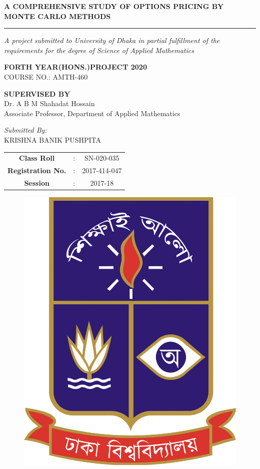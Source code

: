 
\thispagestyle{empty}
\begin{center}
	\textcolor{blue!60!black!80}{\Large\bf A COMPREHENSIVE STUDY OF OPTIONS PRICING BY}
	\textcolor{blue!60!black!80}{{\Large\bf MONTE CARLO METHODS\\}}
	\rule{\textwidth}{0.4pt}
	\textcolor{blue!60!black!100}{\it A project submitted to University of Dhaka in partial fulfillment of the requirements for the degree of Science of Applied Mathematics}
	\vspace{.4in}
\end{center}
\begin{center}
	\textcolor{blue!60!black!80}{\bf FORTH YEAR(HONS.)PROJECT 2020}\\
	\vspace{3pt}
	{COURSE NO.: AMTH-460}
\end{center}
\begin{center}
	\textcolor{blue!60!black!80}{\bf SUPERVISED BY}\\
	\vspace{3pt}
	{Dr. A B M Shahadat Hossain}\\
		{Associate Professor,
			Department of Applied Mathematics}
\end{center}
\vspace{.3in}
\begin{center}
	\textcolor{blue!60!black!80}{\it Submitted By:}\\[2mm]
	KRISHNA BANIK PUSHPITA\\[2mm]
	\begin{tabular}{ c c c}
		{\bf Class Roll} & :& \hspace{0.3in}SN-020-035  \\ 
		{\bf Registration No.} &: & \hspace{0.4in}2017-414-047  \\  
		{\bf Session} & :&2017-18     
	\end{tabular}
	
	\vspace{.6in}
\end{center}

\begin{figure}[H]
	\centering
	\includegraphics[width=.25\linewidth]{logo}
\end{figure}

